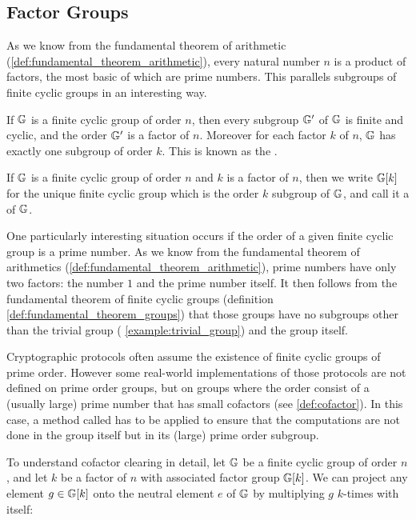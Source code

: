 \subsection{Factor Groups}
As we know from the fundamental theorem of arithmetic (\ref{def:fundamental_theorem_arithmetic}), every natural number $n$ is a product of factors, the most basic of which are prime numbers. This parallels subgroups of finite cyclic groups in an interesting way.

\begin{definition}\label{def:fundamental_theorem_groups}
If $\mathbb{G}$ is a finite cyclic group of order $n$, then every subgroup $\mathbb{G}'$ of $\mathbb{G}$ is finite and cyclic, and the order $\mathbb{G}'$ is a factor of $n$. Moreover for each factor $k$ of $n$, $\mathbb{G}$ has exactly one subgroup of order $k$. This is known as the .
\end{definition}

\begin{notation}If $\mathbb{G}$ is a finite cyclic group of order $n$ and $k$ is a factor of $n$, then we write $\mathbb{G}[k]$ for the unique finite cyclic group which is the order $k$ subgroup of $\mathbb{G}$, and call it a  of $\mathbb{G}$.
\end{notation}

One particularly interesting situation occurs if the order of a given finite cyclic group is a prime number. As we know from the fundamental theorem of arithmetics (\ref{def:fundamental_theorem_arithmetic}), prime numbers have only two factors: the number $1$ and the prime number itself. It then follows from the fundamental theorem of finite cyclic groups (definition \ref{def:fundamental_theorem_groups}) that those groups have no subgroups other than the trivial group (\examplename{} \ref{example:trivial_group}) and the group itself.

Cryptographic protocols often assume the existence of finite cyclic groups of prime order. However  some real-world implementations of those protocols are not defined on prime order groups, but on groups where the order consist of a (usually large) prime number that has small cofactors (see \notationname{} \ref{def:cofactor}). In this case, a method called  has to be applied to ensure that the computations are not done in the group itself but in its (large) prime order subgroup.

To understand cofactor clearing in detail, let $\mathbb{G}$ be a finite cyclic group of order $n$, and let $k$ be a factor of $n$ with associated factor group $\mathbb{G}[k]$. We can project any element $g\in\mathbb{G}[k]$ onto the neutral element $e$ of $\mathbb{G}$ by multiplying $g$ $k$-times with itself:

